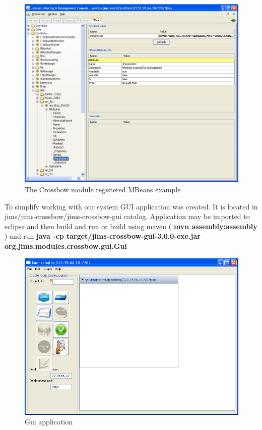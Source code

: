 \documentclass[11pt]{book}
\begin{document}
		\begin{figure}[H]
                  \begin{center}
                    \includegraphics[width=1.0\textwidth]{img/impl/jconsole.png}
                  \end{center}
                  \caption{The Crossbow module registered MBeans example}
                \end{figure}
		
		To simplify working with our system GUI application was created. It is located in jims/jims-crossbow/jims-crossbow-gui catalog. Application 
		may be imported to eclipse and then build and run or build using maven (\textbf{ mvn assembly:assembly }) and run 
                \textbf{java -cp target/jims-crossbow-gui-3.0.0-exe.jar org.jims.modules.crossbow.gui.Gui}

		\begin{figure}[H]
                  \begin{center}
                    \includegraphics[width=1.0\textwidth]{img/impl/gui.png}
                  \end{center}
                  \caption{Gui application}
                \end{figure}
		
\end{document}
